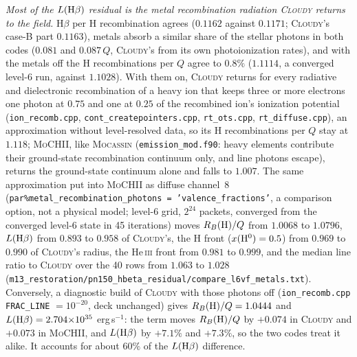 \documentclass[english,a4paper]{my_memo}
\newcommand{\code}[1]{\texttt{#1}}
\newcommand{\MoCHII}{\textsc{MoCHII}}
\newcommand{\Mocassin}{\textsc{Mocassin}}
\newcommand{\Cloudy}{\textsc{Cloudy}}
\begin{document}
\emph{Most of the $L({\rm H}\beta)$ residual is the metal recombination
radiation \Cloudy{} returns to the field.}  H$\beta$ per H recombination
agrees ($0.1162$ against $0.1171$; \Cloudy{}'s case-B part $0.1163$), metals
absorb a similar share of the stellar photons in both codes ($0.081$ and
$0.087\,Q$, \Cloudy{}'s from its own photoionization rates), and with the
metals off the H recombinations per $Q$ agree to $0.8\%$ ($1.1114$, a
converged level-6 run, against $1.1028$).  With them on, \Cloudy{} returns
for every radiative and dielectronic recombination of a heavy ion that
keeps three or more electrons one photon at $0.75$ and one at $0.25$ of the
recombined ion's ionization potential (\code{ion\_recomb.cpp},
\code{cont\_createpointers.cpp}, \code{rt\_ots.cpp},
\code{rt\_diffuse.cpp}), an approximation without level-resolved data, so
its H recombinations per $Q$ stay at $1.118$; \MoCHII{}, like \Mocassin{}
(\code{emission\_mod.f90}: heavy elements contribute their ground-state
recombination continuum only, and line photons escape), returns the
ground-state continuum alone and falls to $1.007$.  The same approximation
put into \MoCHII{} as diffuse channel~8
(\code{par\%metal\_recombination\_photons = 'valence\_fractions'}, a
comparison option, not a physical model; level-6 grid, $2^{24}$ packets,
converged from the converged level-6 state in 45 iterations) moves
$R_B({\rm H})/Q$ from $1.0068$ to $1.0796$, $L({\rm H}\beta)$ from $0.893$
to $0.958$ of \Cloudy{}'s, the H front ($x({\rm H^0}) = 0.5$) from $0.969$
to $0.990$ of \Cloudy{}'s radius, the He\,\textsc{iii} front from $0.981$
to $0.999$, and the median line ratio to \Cloudy{} over the 40 rows from
$1.063$ to $1.028$
(\code{m13\_restoration/pn150\_hbeta\_residual/compare\_l6vf\_metals.txt}).
Conversely, a diagnostic build of \Cloudy{} with those photons off
(\code{ion\_recomb.cpp} \code{FRAC\_LINE} $=10^{-20}$, deck unchanged)
gives $R_B({\rm H})/Q = 1.0444$ and $L({\rm H}\beta) = 2.704{\times}10^{35}$
erg\,s$^{-1}$: the term moves $R_B({\rm H})/Q$ by $+0.074$ in \Cloudy{} and
$+0.073$ in \MoCHII{}, and $L({\rm H}\beta)$ by $+7.1\%$ and $+7.3\%$, so the
two codes treat it alike.  It accounts for about $60\%$ of the
$L({\rm H}\beta)$ difference.
\end{document}
